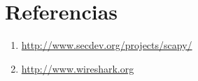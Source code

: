 \section{Referencias}

\begin{enumerate}

\item 
\url{http://www.secdev.org/projects/scapy/}
\item \url{http://www.wireshark.org}

\end{enumerate}
